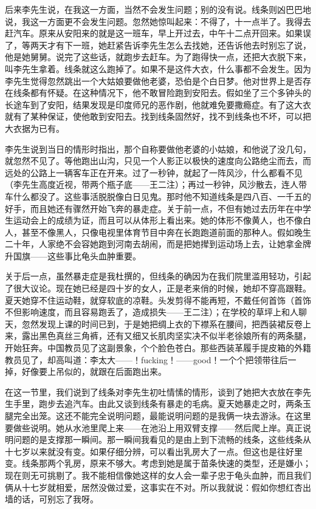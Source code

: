后来李先生说，在我这一方面，当然不会发生问题；别的没有说。线条则凶巴巴地说，我这一方面更不会发生问题。忽然她惊叫起来：不得了，十一点半了。我得去赶汽车。原来从安阳来的就是这一班车，早上开过去，中午十二点开回来。如果误了，等两天才有下一班，她赶紧告诉李先生怎么去找她，还告诉他去时别忘了说，他是她舅舅。说完了这些话，就跑步去赶车。为了跑得快一点，还把大衣脱下来，叫李先生拿着。线条就这么跑掉了。如果不是这件大衣，什么事都不会发生。因为李先生觉得忽然跳出一个大姑娘要做他老婆，恐伯是个白日梦。他对世界上是否存在线条都有怀疑。在这种情况下，他不敢冒险跑到安阳去。假如坐了三个多钟头的长途车到了安阳，结果发现是印度师兄的恶作剧，他就难免要撒瘾症。有了这大衣就有了某种保证，使他敢到安阳去。找到线条固然好，找不到线条也不坏，可以把大衣据为已有。 

李先生说到当日的情形时指出，那个自称要做他老婆的小姑娘，和他说了没几句，就忽然不见了。等他跑出山沟，只见一个人影正以极快的速度向公路绝尘而去，而远处的公路上一辆客车正在开来。过了一秒钟，就起了一阵风沙，什么都看不见（李先生高度近视，带两个瓶子底——王二注）；再过一秒钟，风沙散去，连人带车什么都没了。这些事活脱脱像白日见鬼。那时他不知道线条是四八百、一千五的好手，而且她还有骤然开始飞奔的暴走症。关于前一点，不但有她过去历年在中学生运动会上的成绩为证，而且可以从体形上看出来。她的体形不像黄人，也不像白人，甚至不像黑人，只像电视里体育节目中奔在长跑跑道前面的那种人。假如晚生二十年，人家绝不会容她跑到河南去胡闹，而是把她撵到运动场上去，让她拿金牌升国旗——这些事比龟头血肿重要。 

关于后一点，虽然暴走症是我杜撰的，但线条的确因为在我们院里滥用轻功，引起了很大议论。现在她已经是四十岁的女人，正是老来俏的时候，她却不穿高跟鞋。夏天她穿不住运动鞋，就穿软底的凉鞋。头发剪得不能再短，不戴任何首饰（首饰不但影响速度，而且容易跑丢了，造成损失——王二注）；在学校的草坪上和人聊天，忽然发现上课的时间已到，于是她把绸上衣的下襟系在腰间，把西装裙反卷上来，露出黑色真丝三角裤，还有又细又长肌肉坚实决不似半老徐娘所有的两条腿，开始狂奔。中国教员见了这副景象，个个脸色苍白。那些西装革履手提皮箱的外籍教员见了，却高叫道：李太大——！fucking！——good！一个个把领带往后一掉，好像要上吊似的，就跟在后面跑出来。 

在这一节里，我们说到了线条对李先生初吐情愫的情形，谈到了她把大衣放在李先生手里，跑步去追汽车。由此又谈到线条有暴走的毛病。夏天她暴走之时，两条玉腿完全出笼。这还不能完全说明问题，最能说明问题的是我俩一块去游泳。在这里要做些说明。她从水池里爬上来——在池沿上用双臂支撑——然后爬上岸。真正说明问题的是支撑那一瞬间。那一瞬间我看见的是由上到下流畅的线条，这些线条从十七岁以来就没有变。如果仔细分辨，可以看出乳房大了一点。但这也是往好里变。线条那两个乳房，原来不够大。考虑到她是属于苗条快速的类型，还是嫌小；现在则无可挑剔了。我不能相信像她这样的女人会一辈子忠于龟头血肿，而且我们俩从十七岁就相爱，居然没做过爱，这事实在不对。所以我就说：假如你想红杏出墙的话，可别忘了我呀。

